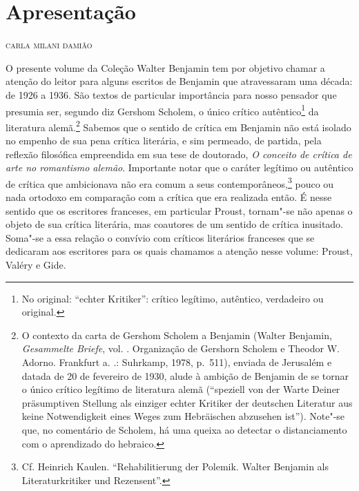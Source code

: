 \chapter*{Apresentação}

\begin{flushright}
{\bigskip\small\scshape\hfill {carla milani damião}}\smallskip
\end{flushright}

\noindent{}O presente volume da Coleção Walter Benjamin tem por objetivo chamar a
atenção do leitor para alguns escritos de Benjamin que atravessaram uma década: de 1926
a 1936. São textos de particular importância para nosso pensador que
presumia ser, segundo diz Gershom Scholem, o único crítico autêntico\footnote{No original: ``echter Kritiker'': crítico legítimo, autêntico, verdadeiro ou original.} da
literatura alemã.\footnote{O contexto da carta de Gershom Scholem a
  Benjamin (Walter Benjamin, \emph{Gesammelte Briefe}, vol. . Organização de Gershorn
  Scholem e Theodor W. Adorno. Frankfurt a. .: Suhrkamp, 1978, p.~511), enviada de Jerusalém e datada de 20 de fevereiro de 1930, alude à ambição de
  Benjamin de se tornar o único crítico legítimo de literatura alemã
  (``speziell von der Warte Deiner präsumptiven Stellung als einziger
      echter Kritiker der deutschen Literatur aus keine Notwendigkeit eines
      Weges zum Hebräischen abzusehen ist''). Note"-se que, no comentário de
  Scholem, há uma queixa ao detectar o distanciamento com o aprendizado
  do hebraico.} Sabemos que o sentido de crítica em Benjamin não está
isolado no empenho de sua pena crítica literária, e sim permeado, de
partida, pela reflexão filosófica empreendida em sua tese de doutorado,
\emph{O conceito de crítica de arte no romantismo alemão}. Importante
notar que o caráter legítimo ou autêntico de crítica que ambicionava não era comum a
seus contemporâneos,\footnote{Cf. Heinrich Kaulen. ``Rehabilitierung der
  Polemik. Walter Benjamin als Literaturkritiker und Rezensent''.} pouco ou nada ortodoxo em comparação com a crítica que
era realizada então. É nesse sentido que os escritores franceses, em particular Proust, tornam"-se não apenas o objeto de sua crítica literária, mas coautores de um sentido de crítica inusitado. Soma"-se a essa relação o convívio com críticos literários franceses que se dedicaram aos escritores para os quais chamamos a atenção nesse volume: Proust, Valéry e Gide.

